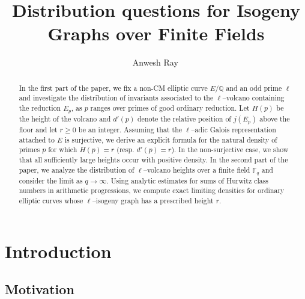 \documentclass[table]{amsart}
\title{Distribution questions for Isogeny Graphs over Finite Fields}
\author[A.~Ray]{Anwesh Ray\, \orcidlink{0000-0001-6946-1559}}
\newcommand{\Q}{\mathbb{Q}}
\newcommand{\F}{\mathbb{F}}
\numberwithin{equation}{section}
\begin{document}
\maketitle

\begin{abstract}
In the first part of the paper, we fix a non-CM elliptic curve $E/\Q$ and an odd prime $\ell$ and investigate the distribution of invariants associated to the $\ell$–volcano containing the reduction $E_p$, as $p$ ranges over primes of good ordinary reduction. Let $H(p)$ be the height of the volcano and $d'(p)$ denote the relative position of $j(E_p)$ above the floor and let $r\geq 0$ be an integer. Assuming that the $\ell$–adic Galois representation attached to $E$ is surjective, we derive an explicit formula for the natural density of primes $p$ for which $H(p)=r$ (resp. $d'(p)=r$). In the non-surjective case, we show that all sufficiently large heights occur with positive density. In the second part of the paper, we analyze the distribution of $\ell$–volcano heights over a finite field $\F_q$ and consider the limit as $q\rightarrow \infty$. Using analytic estimates for sums of Hurwitz class numbers in arithmetic progressions, we compute exact limiting densities for ordinary elliptic curves whose $\ell$–isogeny graph has a prescribed height $r$.
\end{abstract}


\section{Introduction}

\subsection{Motivation}
\end{document}
